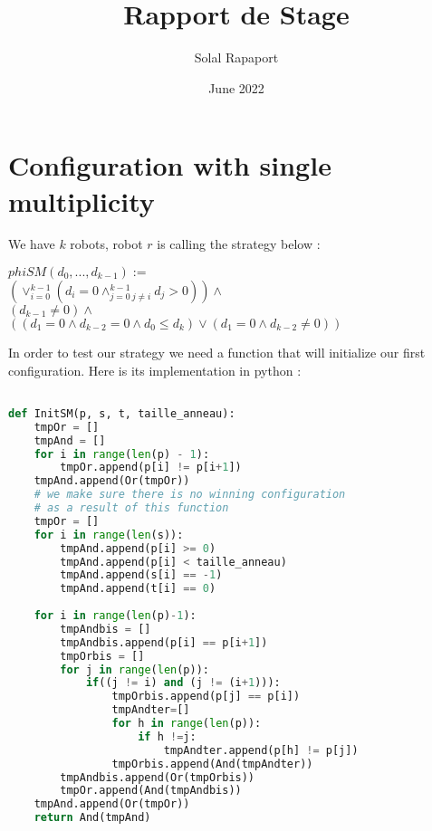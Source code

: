 \documentclass{article}
\title{Rapport de Stage}
\author{Solal Rapaport }
\date{June 2022}
\begin{document}
\maketitle

\section{Configuration with single multiplicity}

We have $k$ robots, robot $r$ is calling the strategy below :
\begin{center}
$phiSM(d_0, ..., d_{k-1}):=$\\
$(\lor_{i=0}^{k-1}(d_i = 0\land_{j=0\ j\not=i}^{k-1} d_j > 0))\land$\\
$(d_{k-1} \not= 0) \land $\\
$((d_1 = 0 \land d_{k-2} = 0 \land d_0 \leq d_k) \lor (d_1 = 0 \land d_{k-2} \not= 0))$
\end{center}

In order to test our strategy we need a function that will initialize our first configuration. Here is its implementation in python :

\begin{lstlisting}[language=Python]

def InitSM(p, s, t, taille_anneau):
    tmpOr = []
    tmpAnd = []
    for i in range(len(p) - 1):
        tmpOr.append(p[i] != p[i+1])
    tmpAnd.append(Or(tmpOr))
    # we make sure there is no winning configuration
    # as a result of this function
    tmpOr = []
    for i in range(len(s)):
        tmpAnd.append(p[i] >= 0)
        tmpAnd.append(p[i] < taille_anneau)
        tmpAnd.append(s[i] == -1)
        tmpAnd.append(t[i] == 0)
    
    for i in range(len(p)-1):
        tmpAndbis = []
        tmpAndbis.append(p[i] == p[i+1])
        tmpOrbis = []
        for j in range(len(p)):
            if((j != i) and (j != (i+1))):
                tmpOrbis.append(p[j] == p[i])
                tmpAndter=[]
                for h in range(len(p)):
                    if h !=j:
                        tmpAndter.append(p[h] != p[j])
                tmpOrbis.append(And(tmpAndter))
        tmpAndbis.append(Or(tmpOrbis))
        tmpOr.append(And(tmpAndbis))
    tmpAnd.append(Or(tmpOr))
    return And(tmpAnd)
\end{lstlisting}
\end{document}
